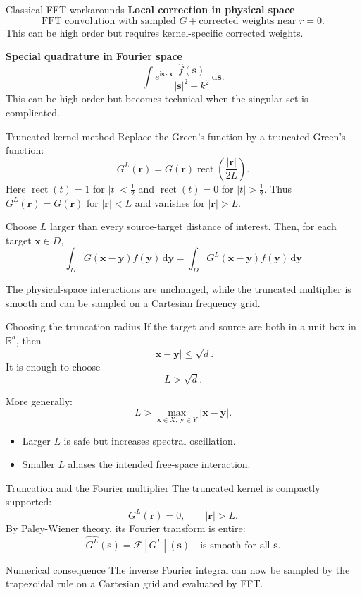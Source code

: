\documentclass[aspectratio=169,11pt]{beamer}
\newcommand{\R}{\mathbb{R}}
\newcommand{\dd}{\,\mathrm d}
\newcommand{\ii}{\mathrm i}
\newcommand{\x}{\bm{x}}
\newcommand{\y}{\bm{y}}
\newcommand{\s}{\bm{s}}
\newcommand{\rvec}{\bm{r}}
\DeclareMathOperator{\rect}{rect}
\begin{document}
\begin{frame}{Classical FFT workarounds}
\small
\textbf{Local correction in physical space}
\[
  \text{FFT convolution with sampled }G
  +
  \text{corrected weights near }r=0.
\]
This can be high order but requires kernel-specific corrected weights.

\vspace{3mm}
\textbf{Special quadrature in Fourier space}
\[
  \int e^{\ii \s\cdot\x}
  \frac{\widehat f(\s)}{|\s|^2-k^2}\dd\s.
\]
This can be high order but becomes technical when the singular set is complicated.
\end{frame}

\begin{frame}{Truncated kernel method}
\small
Replace the Green's function by a truncated Green's function:
\[
  G^L(\rvec)=G(\rvec)\rect\!\left(\frac{|\rvec|}{2L}\right).
\]
Here $\rect(t)=1$ for $|t|<\tfrac12$ and $\rect(t)=0$ for $|t|>\tfrac12$.
Thus $G^L(\rvec)=G(\rvec)$ for $|\rvec|<L$ and vanishes for $|\rvec|>L$.

\vspace{1mm}
Choose $L$ larger than every source-target distance of interest. Then, for
each target $\x\in D$,
\[
  \int_D G(\x-\y)f(\y)\dd\y
  =
  \int_D G^L(\x-\y)f(\y)\dd\y
\]

The physical-space interactions are unchanged, while the truncated multiplier
is smooth and can be sampled on a Cartesian frequency grid.
\end{frame}

\begin{frame}{Choosing the truncation radius}
\small
If the target and source are both in a unit box in $\R^d$, then
\[
  |\x-\y|\le \sqrt d.
\]
It is enough to choose
\[
  L>\sqrt d.
\]

\vspace{2mm}
More generally:
\[
  L>\max_{\x\in X,\ \y\in Y}|\x-\y|.
\]
\begin{itemize}
  \item Larger $L$ is safe but increases spectral oscillation.
  \item Smaller $L$ aliases the intended free-space interaction.
\end{itemize}
\end{frame}

\begin{frame}{Truncation and the Fourier multiplier}
\small
The truncated kernel is compactly supported:
\[
  G^L(\rvec)=0,\qquad |\rvec|>L.
\]
By Paley-Wiener theory, its Fourier transform is entire:
\[
  \widehat{G^L}(\s)=\mathscr{F}[G^L](\s)
  \quad\text{is smooth for all }\s.
\]

\begin{block}{Numerical consequence}
The inverse Fourier integral can now be sampled by the trapezoidal rule on a Cartesian grid and evaluated by FFT.
\end{block}
\end{frame}
\end{document}
